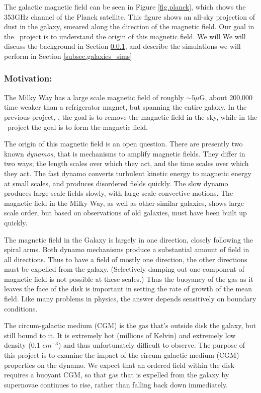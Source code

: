 The galactic magnetic field can be seen in Figure \ref{fig.planck}, which shows
the 353GHz channel of the Planck satellite.  This figure
shows an all-sky projection of dust in the galaxy, smeared along the direction of
the magnetic field.  Our goal in the \nameGalaxies\ project is to understand the
origin of this magnetic field.   We will We will discuss the background in Section
\ref{subsec.galaxies_motivate}, and describe the simulations we will perform in
Section \ref{subsec.galaxies_sims}

\subsubsection{Motivation: \nameGalaxies}
\label{subsec.galaxies_motivate}

The Milky Way has a large scale magnetic
field of roughly $\sim 5 \mu$G, about 200,000 time weaker than a refrigerator
magnet, but spanning the entire galaxy.   In the previous project, \nameCMB, the
goal is to remove the magnetic field in the sky, while in
the \nameGalaxies\ project the goal is to form the magnetic field.

The origin of this magnetic field is an open question.  There are presently two
known \emph{dynamos}, that is mechanisms to amplify magnetic fields. They differ in
two ways; the length scales over which they act, and the time scales over which
they act.  The fast
dynamo converts turbulent kinetic energy to magnetic energy at small scales, and
produces disordered fields quickly.  The slow dynamo produces large scale fields
slowly, with large scale convective motions. The magnetic field in the Milky Way, as well as other similar galaxies,
shows large scale order, but based on observations of old galaxies, must have been
built up quickly. 

The magnetic field in the Galaxy is largely in one direction, closely following
the spiral arms.  Both
dynamo mechanisms produce a
substantial amount of field in all directions.  Thus to have a field of mostly
one direction, the other directions must be expelled from the galaxy.
(Selectively damping out one component of magnetic field is not possible at
these scales.)
Thus the buoyancy of the gas as
it leaves the face of the disk is important in setting the rate of growth of
the mean field.  Like many problems in physics, the answer depends sensitively
on boundary conditions.

The circum-galactic medium (CGM) is the gas that's outside disk the galaxy, but still
bound to it.  It is extremely hot (millions of Kelvin) and extremely low density
(0.1 $cm^{-3}$) and thus unfortunately difficult to observe.
The purpose of this project is to examine the impact of the circum-galactic
medium (CGM) properties on the dynamo. We expect that an ordered field within
the disk requires a buoyant CGM, so that gas that is expelled from the galaxy by
supernovae continues to rise, rather than falling back down immediately.  

